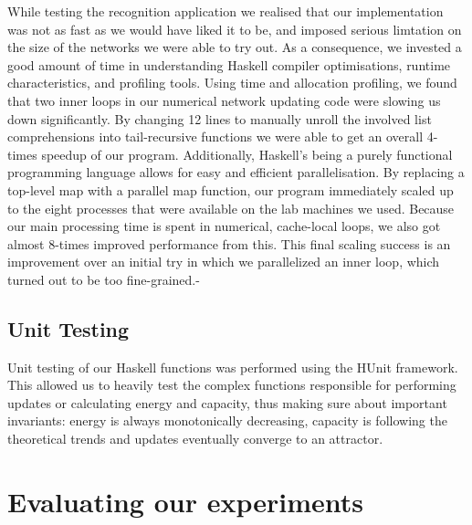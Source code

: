 While testing the recognition application we realised that our implementation was not as fast as we would have liked it to be, and imposed serious limtation on the size of the networks we were able to try out.
As a consequence, we invested a good amount of time in understanding Haskell compiler optimisations, runtime characteristics, and profiling tools. Using time and allocation profiling, we found that two inner loops in our numerical network updating code were slowing us down significantly. By changing 12 lines to manually unroll the involved list comprehensions into tail-recursive functions we were able to get an overall 4-times speedup of our program.
Additionally, Haskell's being a purely functional programming language allows for easy and efficient parallelisation.
By replacing a top-level map with a parallel map function, our program immediately scaled up to the eight processes that were available on the lab machines we used. Because our main processing time is spent in numerical, cache-local loops, we also got almost 8-times improved performance from this. This final scaling success is an improvement over an initial try in which we parallelized an inner loop, which turned out to be too fine-grained.-


\subsection{Unit Testing}

Unit testing of our Haskell functions was performed using the HUnit framework. This allowed us to heavily test the complex functions responsible for performing updates or calculating energy and capacity, thus making sure about important invariants: energy is always monotonically decreasing, capacity is following the theoretical trends and updates eventually converge to an attractor. 


\section{Evaluating our experiments}

